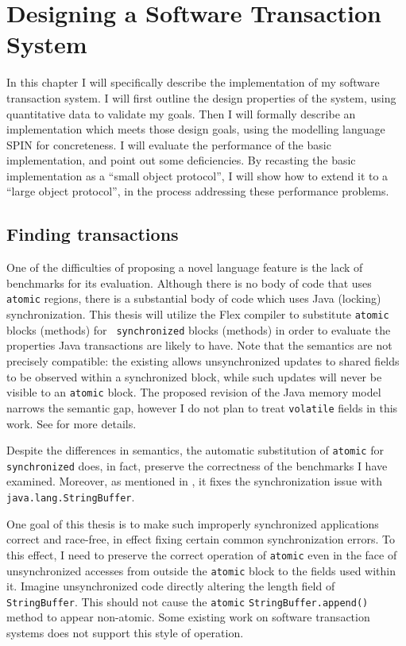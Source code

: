 \chapter{Designing a Software Transaction System}\label{sec:stm}

In this chapter I will specifically describe the implementation of
my software transaction system.  I will first outline the design
properties of the system, using quantitative data to validate my
goals.  Then I will formally describe an implementation which meets those
design goals, using the modelling language SPIN for concreteness.  I
will evaluate the performance of the basic implementation, and point
out some deficiencies.  By recasting the basic implementation as a
``small object protocol'', I will show how to extend it to a ``large
object protocol'', in the process addressing these performance
problems.

\section{Finding transactions}\label{sec:auto}
One of the difficulties of proposing a novel language feature is the
lack of benchmarks for its evaluation.  Although there is no body of
code that uses {\tt atomic} regions, there is a substantial body of
code which uses Java (locking) synchronization.  This thesis will
utilize the Flex compiler \cite{Flex} to
substitute {\tt atomic} blocks (methods) for {\tt
  synchronized} blocks (methods) in order to evaluate the properties
Java transactions are likely to have.  Note that the semantics are not
precisely compatible: the existing  allows
unsynchronized updates to shared fields to be observed within a
synchronized block, while such updates will never be visible to an
{\tt atomic} block.  The proposed revision of the Java memory model
\cite{MansonPu02} narrows the semantic gap, however I do not
plan to treat {\tt volatile} fields in this work.  See
 for more details.

Despite the differences in semantics, the automatic substitution of
{\tt atomic} for {\tt synchronized} does, in fact, preserve the
correctness of the benchmarks I have examined.  Moreover, as
mentioned in , it
fixes the synchronization issue with {\tt java.lang.StringBuffer}.

One goal of this thesis is to make such improperly synchronized
applications correct and race-free, in effect fixing certain common
synchronization errors.  To this effect, I need to preserve the
correct operation of {\tt atomic} even in the face of unsynchronized
accesses from outside the {\tt atomic} block to the fields used within
it.  Imagine unsynchronized code directly altering the length field of
{\tt StringBuffer}.  This should not cause the {\tt atomic}
{\tt StringBuffer.append()} method to appear non-atomic.
Some existing work on software transaction systems \cite{HarrisFr03}
does not support this style of operation.

